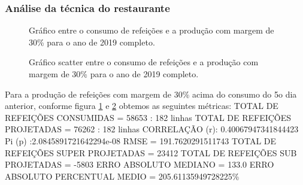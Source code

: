 \documentclass[	12pt, Times, openright, twoside, a4paper, english, brazil]{abntex2}
\begin{document}
    	    \subsubsection{Análise da técnica do restaurante}
    	        \begin{figure}[!ht]
                  \caption{Gráfico entre o consumo de refeições e a produção com margem de 30\% para o ano de 2019 completo. \label{fig:ru_pred} }
                \end{figure}
                 \begin{figure}[!ht]
                  \caption{Gráfico scatter entre o consumo de refeições e a produção com margem de 30\% para o ano de 2019 completo. \label{fig:ru_pred_scatter} }
                \end{figure}
                Para a produção de refeições com margem de 30\% acima do consumo do 5o dia anterior, conforme figura \ref{fig:ru_pred} e \ref{fig:ru_pred_scatter} obtemos as seguintes métricas:\newline
                TOTAL DE REFEIÇÕES CONSUMIDAS = 58653 : 182 linhas \newline
                TOTAL DE REFEIÇÕES PROJETADAS = 76262 : 182 linhas CORRELAÇÃO (r): 0.40067947341844423 \newline
                Pi (p) :2.0845891721642294e-08\newline
                RMSE = 191.7620291511743 \newline
                TOTAL DE REFEIÇÕES SUPER PROJETADAS = 23412 \newline
                TOTAL DE REFEIÇÕES SUB PROJETADAS = -5803 \newline
                ERRO ABSOLUTO MEDIANO = 133.0 \newline
                ERRO ABSOLUTO PERCENTUAL MEDIO = 205.61135949728225\% \newline
\end{document}
